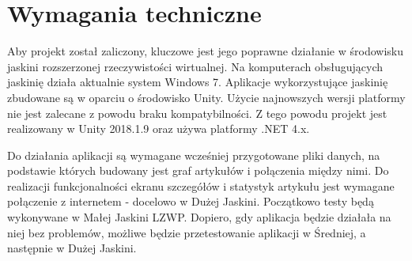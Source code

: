 \section{Wymagania techniczne}
Aby projekt został zaliczony, kluczowe jest jego poprawne działanie w środowisku jaskini rozszerzonej rzeczywistości wirtualnej. Na komputerach obsługujących jaskinię działa aktualnie system Windows 7. Aplikacje wykorzystujące jaskinię zbudowane są w oparciu o środowisko Unity. Użycie najnowszych wersji platformy nie jest zalecane z powodu braku kompatybilności. Z tego powodu projekt jest realizowany w Unity 2018.1.9 oraz używa platformy .NET 4.x.

Do działania aplikacji są wymagane wcześniej przygotowane pliki danych, na podstawie których budowany jest graf artykułów i połączenia między nimi. Do realizacji funkcjonalności ekranu szczegółów i statystyk artykułu jest wymagane połączenie z internetem - docelowo w Dużej Jaskini. Początkowo testy będą wykonywane w Małej Jaskini LZWP. Dopiero, gdy aplikacja będzie działała na niej bez problemów, możliwe będzie przetestowanie aplikacji w Średniej, a następnie w Dużej Jaskini.
\newpage